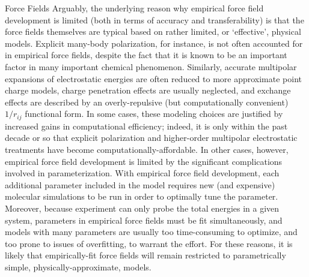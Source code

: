 \begin{section}{Force Fields}
Arguably, the underlying reason why empirical force field development is
limited (both in terms of accuracy and transferability) is that the
force fields themselves are typical based on rather limited, or `effective', physical
models.
\cite{Parker2015,Sherrill2009,Zgarbova2010}
Explicit many-body polarization, for instance, is not often accounted for in
empirical force fields, despite the fact that it is known to be an important
factor in many important chemical phenomenon.
\cite{Cisneros2016a,Freddolino2010,Cieplak2009}
Similarly, accurate multipolar expansions of electrostatic energies are often
reduced to more approximate point charge models,\cite{Cardamone2014} 
charge penetration effects are usually neglected,
\cite{Parker2015,Sherrill2009}
and exchange effects are described by an overly-repulsive (but computationally
convenient) $1/r_{ij}$ functional form.
\cite{Abrahamson1963,Mackerell2004,Parker2015,Sherrill2009,Zgarbova2010}
In some cases, these modeling choices are justified by increased gains in
computational efficiency; indeed, it is only within the past decade or so that
explicit polarization and higher-order multipolar electrostatic
treatments have become computationally-affordable.
\cite{Albaugh2016,Cardamone2014,Cieplak2009,Simmonett2015,Simmonett2016,Demerdash2014}
In other cases, however, empirical force field development is limited by the
significant complications involved in parameterization.
With empirical force field development, each additional parameter included in
the model requires new (and expensive) molecular simulations to be run in
order to optimally tune the parameter. Moreover, because experiment can
only probe the total energies in a given system, parameters in empirical
force fields must be fit simultaneously, and models with many parameters are
usually too time-consuming to optimize, and too prone to issues of
overfitting,\cite{Hawkins2004} to warrant the effort. For these reasons, it is
likely that empirically-fit force fields will remain restricted to
parametrically simple, physically-approximate, models.


\end{section}
